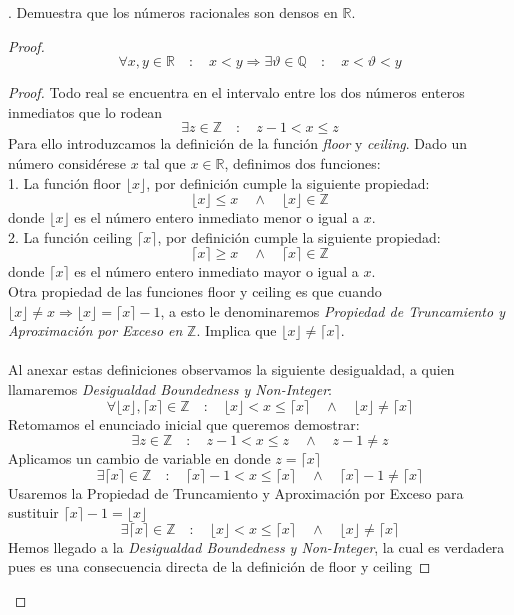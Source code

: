 \documentclass{article}
\begin{document}
  . Demuestra que los números racionales son densos en \(\mathbb{R}\). \\
  \begin{proof}
      \[\forall x,y \in \mathbb{R} \quad : \quad x < y \Rightarrow \exists \vartheta \in \mathbb{Q} \quad : \quad x < \vartheta < y \]

      \begin{mdframed}
          \begin{proof}
          Todo real se encuentra en el intervalo entre los dos números enteros inmediatos que lo rodean
\[\exists z \in \mathbb{Z} \quad : \quad z-1 < x \leq z\]
Para ello introduzcamos la definición de la función \textit{floor} y \textit{ceiling}.
Dado un número considérese \(x\) tal que \(x \in \mathbb{R}\), definimos dos funciones:\\
1. La función floor \(\lfloor x \rfloor\), por definición cumple la siguiente propiedad:
\[
\lfloor x \rfloor \leq x \quad \land \quad \lfloor x \rfloor \in \mathbb{Z}
\]
donde \(\lfloor x \rfloor\) es el número entero inmediato menor o igual a \(x\).\\
2. La función ceiling \(\lceil x \rceil\), por definición cumple la siguiente propiedad:
\[
\lceil x \rceil \geq x \quad \land \quad \lceil x \rceil \in \mathbb{Z}
\]
donde \(\lceil x \rceil\) es el número entero inmediato mayor o igual a \(x\).\\
Otra propiedad de las funciones floor y ceiling es que cuando \( \lfloor x \rfloor \neq x \Rightarrow \lfloor x \rfloor = \lceil x \rceil - 1 \), a esto le denominaremos \textit{Propiedad de Truncamiento y Aproximación por Exceso en} \( \mathbb{Z} \). Implica que \(\lfloor x \rfloor \neq \lceil x \rceil\).\\\\

Al anexar estas definiciones observamos la siguiente desigualdad, a quien llamaremos \textit{Desigualdad Boundedness y Non-Integer}:
\[ \forall \lfloor x \rfloor, \lceil x \rceil \in \mathbb{Z} \quad : \quad \lfloor x \rfloor < x \leq \lceil x \rceil \quad \land \quad \lfloor x \rfloor \neq \lceil x \rceil \]
Retomamos el enunciado inicial que queremos demostrar:
\[ \exists z \in \mathbb{Z} \quad : \quad z-1 < x \leq z \quad \land \quad z-1 \neq z \]
Aplicamos un cambio de variable en donde \(z = \lceil x \rceil\)
\[ \exists \lceil x \rceil \in \mathbb{Z} \quad : \quad \lceil x \rceil-1 < x \leq \lceil x \rceil \quad \land \quad \lceil x \rceil-1 \neq \lceil x \rceil \]
Usaremos la Propiedad de Truncamiento y Aproximación por Exceso para sustituir \( \lceil x \rceil - 1 = \lfloor x \rfloor \) \\
\[ \exists \lceil x \rceil \in \mathbb{Z} \quad : \quad \lfloor x \rfloor < x \leq \lceil x \rceil \quad \land \quad \lfloor x \rfloor \neq \lceil x \rceil \]
Hemos llegado a la \textit{Desigualdad Boundedness y Non-Integer}, la cual es verdadera pues es una consecuencia directa de la definición de floor y ceiling
\end{proof}
      \end{mdframed}
  \end{proof}
\end{document}
